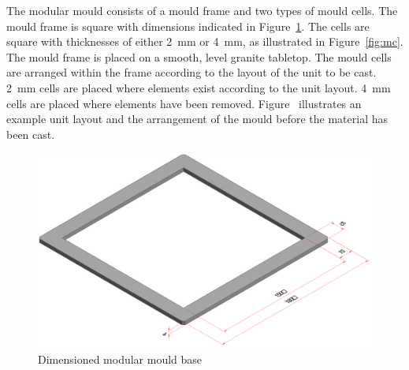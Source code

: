 The modular mould consists of a mould frame and two types of mould cells. The mould frame is square with dimensions indicated in Figure~\ref{fig:mb}. The cells are square with thicknesses of either \SI{2}{mm} or \SI{4}{mm}, as illustrated in Figure~\ref{fig:mc}. The mould frame is placed on a smooth, level granite tabletop. The mould cells are arranged within the frame according to the layout of the unit to be cast. \SI{2}{mm} cells are placed where elements exist according to the unit layout. \SI{4}{mm} cells are placed where elements have been removed. Figure~ illustrates an example unit layout and the arrangement of the mould before the material has been cast.

\begin{figure}[H]
	\centering
	\includegraphics[width=\textwidth]{MB.png}
	\caption{Dimensioned modular mould base}
	\label{fig:mb}
\end{figure}

